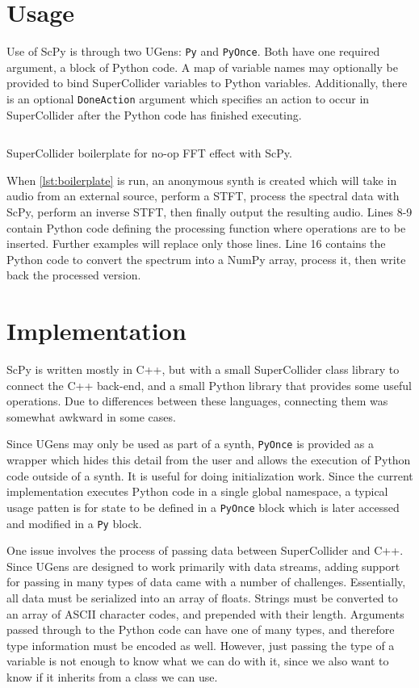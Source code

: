 \documentclass{article}
\begin{document}
\section{Usage}

Use of ScPy is through two UGens: \texttt{Py} and \texttt{PyOnce}. Both have one required argument,
a block of Python code. A map of variable names may optionally be provided to bind SuperCollider
variables to Python variables.  Additionally, there is an optional \texttt{DoneAction} argument which
specifies an action to occur in SuperCollider after the Python code has finished executing.

\begin{listing}[H]
    \inputminted[linenos=true]{SuperCollider}{../examples/template.sc}
    \caption{SuperCollider boilerplate for no-op FFT effect with ScPy.}
    \label{lst:boilerplate}
\end{listing}

When \autoref{lst:boilerplate} is run, an anonymous synth is created which will take in audio
from an external source, perform a STFT, process the spectral data with ScPy, perform an inverse
STFT, then finally output the resulting audio. Lines 8-9 contain Python code defining the
processing function where operations are to be inserted. Further examples will replace only those
lines. Line 16 contains the Python code to convert the spectrum into a NumPy array, process it,
then write back the processed version.

\section{Implementation}

ScPy is written mostly in C++, but with a small SuperCollider class library to connect the C++
back-end, and a small Python library that provides some useful operations. Due to differences
between these languages, connecting them was somewhat awkward in some cases.

Since UGens may only be used as part of a synth, \texttt{PyOnce} is provided as a wrapper which
hides this detail from the user and allows the execution of Python code outside of a synth. It is
useful for doing initialization work.  Since the current implementation executes Python code in a
single global namespace, a typical usage patten is for state to be defined in a \texttt{PyOnce}
block which is later accessed and modified in a \texttt{Py} block.

One issue involves the process of passing data between SuperCollider and C++. Since UGens are
designed to work primarily with data streams, adding support for passing in many types of data came
with a number of challenges. Essentially, all data must be serialized into an array of floats.
Strings must be converted to an array of ASCII character codes, and prepended with their length.
Arguments passed through to the Python code can have one of many types, and therefore type
information must be encoded as well. However, just passing the type of a variable is not enough to
know what we can do with it, since we also want to know if it inherits from a class we can use.
\end{document}
